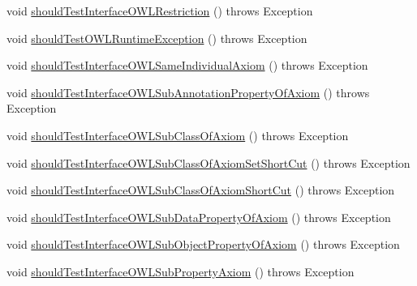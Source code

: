 \begin{DoxyCompactItemize}
\item 
void \hyperlink{classorg_1_1semanticweb_1_1owlapi_1_1contract_1_1_contract_owlapi_model__4_test_a9b16a56b0ec657b5e75756c4a1f4e68b}{should\-Test\-Interface\-O\-W\-L\-Restriction} ()  throws Exception 
\item 
void \hyperlink{classorg_1_1semanticweb_1_1owlapi_1_1contract_1_1_contract_owlapi_model__4_test_aadc514177f979b94d5528779c51e200f}{should\-Test\-O\-W\-L\-Runtime\-Exception} ()  throws Exception 
\item 
void \hyperlink{classorg_1_1semanticweb_1_1owlapi_1_1contract_1_1_contract_owlapi_model__4_test_a58cdd0ede13be8a699d6e2bb2ea3e6d4}{should\-Test\-Interface\-O\-W\-L\-Same\-Individual\-Axiom} ()  throws Exception 
\item 
void \hyperlink{classorg_1_1semanticweb_1_1owlapi_1_1contract_1_1_contract_owlapi_model__4_test_a2a265cda61bee6a660fd2f87b045ca8a}{should\-Test\-Interface\-O\-W\-L\-Sub\-Annotation\-Property\-Of\-Axiom} ()  throws Exception 
\item 
void \hyperlink{classorg_1_1semanticweb_1_1owlapi_1_1contract_1_1_contract_owlapi_model__4_test_a6ced526e5308b80ff189e36842449f07}{should\-Test\-Interface\-O\-W\-L\-Sub\-Class\-Of\-Axiom} ()  throws Exception 
\item 
void \hyperlink{classorg_1_1semanticweb_1_1owlapi_1_1contract_1_1_contract_owlapi_model__4_test_a9cd740d5043a6679118a2fbdb440fa6f}{should\-Test\-Interface\-O\-W\-L\-Sub\-Class\-Of\-Axiom\-Set\-Short\-Cut} ()  throws Exception 
\item 
void \hyperlink{classorg_1_1semanticweb_1_1owlapi_1_1contract_1_1_contract_owlapi_model__4_test_a66ec04c6bb8ee31aaeccde3241b77456}{should\-Test\-Interface\-O\-W\-L\-Sub\-Class\-Of\-Axiom\-Short\-Cut} ()  throws Exception 
\item 
void \hyperlink{classorg_1_1semanticweb_1_1owlapi_1_1contract_1_1_contract_owlapi_model__4_test_a294b001ebe37491b2ea39bc0e193ccac}{should\-Test\-Interface\-O\-W\-L\-Sub\-Data\-Property\-Of\-Axiom} ()  throws Exception 
\item 
void \hyperlink{classorg_1_1semanticweb_1_1owlapi_1_1contract_1_1_contract_owlapi_model__4_test_a0fa745acbf795c11d377da7c71feaba9}{should\-Test\-Interface\-O\-W\-L\-Sub\-Object\-Property\-Of\-Axiom} ()  throws Exception 
\item 
void \hyperlink{classorg_1_1semanticweb_1_1owlapi_1_1contract_1_1_contract_owlapi_model__4_test_ae1241b43e51352c9aa56e4c6a5170426}{should\-Test\-Interface\-O\-W\-L\-Sub\-Property\-Axiom} ()  throws Exception 

\end{DoxyCompactItemize}
